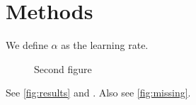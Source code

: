 \documentclass{article}
\begin{document}
\section{Methods}
We define $\alpha$ as the learning rate.

\begin{figure}
  \caption{Second figure}
  \label{fig:second}
\end{figure}

\begin{table}
  \caption{Results table.}
  \label{tab:results}
\end{table}

See \ref{fig:results} and \cite{smith2020}.
Also see \ref{fig:missing}.
\end{document}
